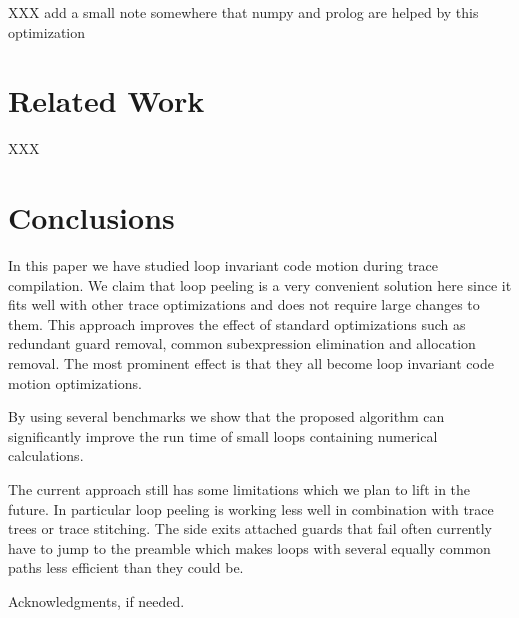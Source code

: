 \documentclass[preprint]{sigplanconf}
\begin{document}
XXX add a small note somewhere that numpy and prolog are helped by this
optimization

\section{Related Work}
\label{sec:related}

XXX

\section{Conclusions}

In this paper we have studied loop invariant code motion during trace
compilation. We claim that loop peeling is a very convenient solution
here since it fits well with other trace optimizations and does not require
large changes to them. This approach improves the effect of standard
optimizations such as redundant guard removal, common subexpression elimination
and allocation removal. The most prominent effect is that they all become loop
invariant code motion optimizations.

By using several benchmarks we show that the proposed algorithm can
significantly improve the run time of small loops containing numerical
calculations. 

The current approach still has some limitations which we plan to lift in the
future. In particular loop peeling is working less well in combination with
trace trees or trace stitching. The side exits attached guards that fail often
currently have to jump to the preamble which makes loops with several equally
common paths less efficient than they could be.



\acks

Acknowledgments, if needed.




\end{document}
